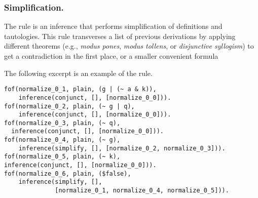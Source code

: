 \documentclass[../main.tex]{subfiles}
\begin{document}
\subsubsection{Simplification.}
\label{sssec:simplify}

The \simplify rule is an inference that performs simplification of
definitions and tautologies. This rule
transverses a list of previous derivations by applying different theorems
(e.g., \emph{modus pones}, \emph{modus tollens}, or \emph{disjunctive
syllogism}) to get a contradiction in the first place, or a smaller
convenient formula

The following \TSTP excerpt is an example of the \simplify rule.

\begin{verbatim}
fof(normalize_0_1, plain, (g | (~ a & k)),
    inference(conjunct, [], [normalize_0_0])).
fof(normalize_0_2, plain, (~ g | q),
    inference(conjunct, [], [normalize_0_0])).
fof(normalize_0_3, plain, (~ q),
  inference(conjunct, [], [normalize_0_0])).
fof(normalize_0_4, plain, (~ g),
    inference(simplify, [], [normalize_0_2, normalize_0_3])).
fof(normalize_0_5, plain, (~ k),
inference(conjunct, [], [normalize_0_0])).
fof(normalize_0_6, plain, ($false),
    inference(simplify, [],
              [normalize_0_1, normalize_0_4, normalize_0_5])).
\end{verbatim}
\end{document}
